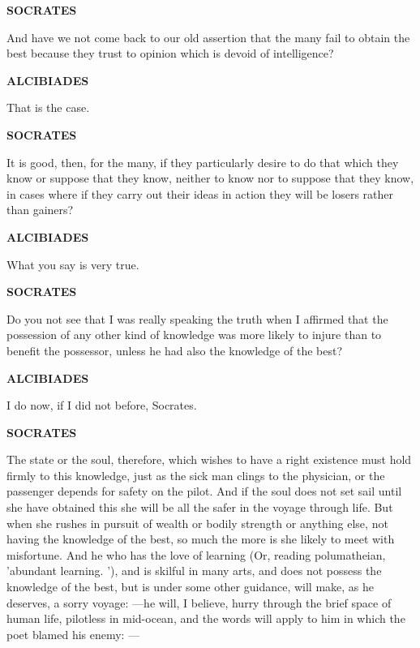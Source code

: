 \documentclass[11pt,letter]{article}
\begin{document}
\par \textbf{SOCRATES}
\par   And have we not come back to our old assertion that the many fail to obtain the best because they trust to opinion which is devoid of intelligence?

\par \textbf{ALCIBIADES}
\par   That is the case.

\par \textbf{SOCRATES}
\par   It is good, then, for the many, if they particularly desire to do that which they know or suppose that they know, neither to know nor to suppose that they know, in cases where if they carry out their ideas in action they will be losers rather than gainers?

\par \textbf{ALCIBIADES}
\par   What you say is very true.

\par \textbf{SOCRATES}
\par   Do you not see that I was really speaking the truth when I affirmed that the possession of any other kind of knowledge was more likely to injure than to benefit the possessor, unless he had also the knowledge of the best?

\par \textbf{ALCIBIADES}
\par   I do now, if I did not before, Socrates.

\par \textbf{SOCRATES}
\par   The state or the soul, therefore, which wishes to have a right existence must hold firmly to this knowledge, just as the sick man clings to the physician, or the passenger depends for safety on the pilot. And if the soul does not set sail until she have obtained this she will be all the safer in the voyage through life. But when she rushes in pursuit of wealth or bodily strength or anything else, not having the knowledge of the best, so much the more is she likely to meet with misfortune. And he who has the love of learning (Or, reading polumatheian, 'abundant learning. '), and is skilful in many arts, and does not possess the knowledge of the best, but is under some other guidance, will make, as he deserves, a sorry voyage: —he will, I believe, hurry through the brief space of human life, pilotless in mid-ocean, and the words will apply to him in which the poet blamed his enemy: —
\end{document}
